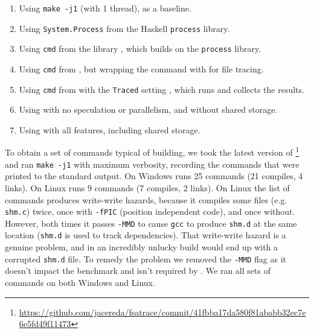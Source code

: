 \begin{enumerate}
\item Using \texttt{make -j1} (\Make with 1 thread), as a baseline.
\item Using \texttt{System.Process} from the Haskell \texttt{process} library.
\item Using \texttt{cmd} from the  \Shake library \cite{shake}, which builds on  the \texttt{process} library.
\item Using \texttt{cmd} from \Shake, but wrapping the command with \Fsatrace for file tracing.
\item Using \texttt{cmd} from \Shake with the \texttt{Traced} setting \cite{neil:file_access}, which runs \Fsatrace and collects the results.
\item Using \Rattle with no speculation or parallelism, and without shared storage.
\item Using \Rattle with all features, including shared storage.
\end{enumerate}

To obtain a set of commands typical of building, we took the latest version of \Fsatrace\footnote{\url{https://github.com/jacereda/fsatrace/commit/41fbba17da580f81ababb32ec7e6e5fd49f11473}} and ran \texttt{make -j1} with maximum verbosity,  recording the commands that were printed to the standard output. On Windows \Fsatrace runs 25 commands (21 compiles, 4 links). On Linux \Fsatrace runs 9 commands (7 compiles, 2 links). On Linux the list of commands produces write-write hazards, because it compiles some files (e.g. \texttt{shm.c}) twice, once with \texttt{-fPIC} (position independent code), and once without. However, both times it passes \texttt{-MMD} to cause \texttt{gcc} to produce \texttt{shm.d} at the same location (\texttt{shm.d} is used to track dependencies). That write-write hazard is a genuine problem, and in an incredibly unlucky build \Fsatrace would end up with a corrupted \texttt{shm.d} file. To remedy the problem we removed the \texttt{-MMD} flag as it doesn't impact the benchmark and isn't required by \Rattle. We ran all sets of commands on both Windows and Linux.

